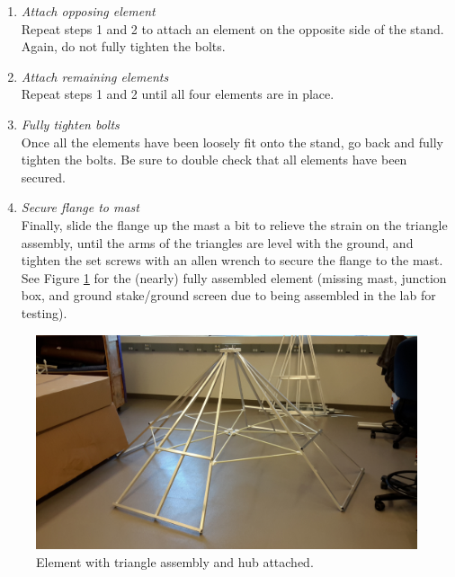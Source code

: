 \documentclass[12pt]{article}
\begin{document}
\begin{enumerate}
\begin{enumerate}
			\item \emph{Attach opposing element} \\ Repeat steps 1 and 2 to attach an element on the opposite side of the stand. Again, do not fully tighten the bolts.
			\item \emph{Attach remaining elements} \\ Repeat steps 1 and 2 until all four elements are in place.
			\item \emph{Fully tighten bolts} \\ Once all the elements have been loosely fit onto the stand, go back and fully tighten the bolts. Be sure to double check that all elements have been secured.
			\item \emph{Secure flange to mast} \\ Finally, slide the flange up the mast a bit to relieve the strain on the triangle assembly, until the arms of the triangles are level with the ground, and tighten the set screws with an allen wrench to secure the flange to the mast. See Figure \ref{AlmostCompleteElement} for the (nearly) fully assembled element (missing mast, junction box, and ground stake/ground screen due to being assembled in the lab for testing).
	\end{enumerate}

\begin{figure}
	\center
	\includegraphics[width=\linewidth]{plots/20141125_112538.jpg}
	\caption{Element with triangle assembly and hub attached. \label{AlmostCompleteElement}}
\end{figure}
			
\end{enumerate}
\end{document}

